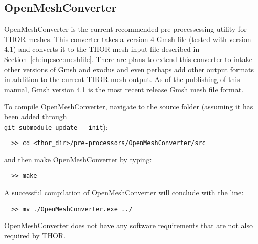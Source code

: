 \subsection{OpenMeshConverter}\label{ch:getstart:sec:preproc:subsec:meshconv}

OpenMeshConverter is the current recommended pre-processessing utility for \ac{THOR} meshes.
This converter takes a version 4 \href{https://gmsh.info/}{Gmsh} file (tested with version 4.1) and converts it to the \ac{THOR} mesh input file described in Section~\ref{ch:inp:sec:meshfile}.
There are plans to extend this converter to intake other versions of Gmsh and exodus and even perhaps add other output formats in addition to the current \ac{THOR} mesh output.
As of the publishing of this manual, Gmsh version 4.1 is the most recent release Gmsh mesh file format.

To compile OpenMeshConverter, navigate to the source folder (assuming it has been added through \\
\verb"git submodule update --init"):
\begin{verbatim}
  >> cd <thor_dir>/pre-processors/OpenMeshConverter/src
\end{verbatim}
and then make OpenMeshConverter by typing:
\begin{verbatim}
  >> make
\end{verbatim}
A successful compilation of OpenMeshConverter will conclude with the line:
\begin{verbatim}
  >> mv ./OpenMeshConverter.exe ../
\end{verbatim}
OpenMeshConverter does not have any software requirements that are not also required by \ac{THOR}.

